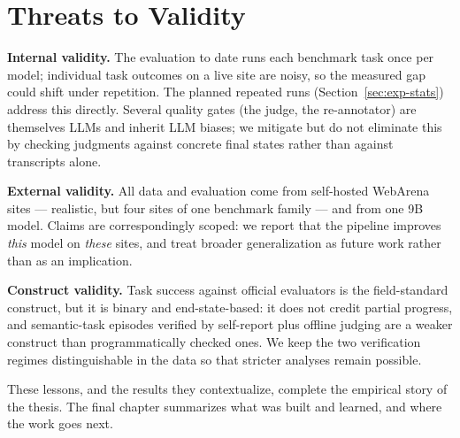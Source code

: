 \section{Threats to Validity}
\label{sec:disc-validity}

\textbf{Internal validity.} The evaluation to date runs each benchmark task
once per model; individual task outcomes on a live site are noisy, so the
measured gap could shift under repetition. The planned repeated runs
(Section~\ref{sec:exp-stats}) address this directly. Several quality gates
(the judge, the re-annotator) are themselves LLMs and inherit LLM biases;
we mitigate but do not eliminate this by checking judgments against concrete
final states rather than against transcripts alone.

\textbf{External validity.} All data and evaluation come from self-hosted
WebArena sites --- realistic, but four sites of one benchmark family ---
and from one 9B model. Claims are correspondingly scoped: we report that the
pipeline improves \emph{this} model on \emph{these} sites, and treat broader
generalization as future work rather than as an implication.

\textbf{Construct validity.} Task success against official evaluators is the
field-standard construct, but it is binary and end-state-based: it does not
credit partial progress, and semantic-task episodes verified by self-report
plus offline judging are a weaker construct than programmatically checked
ones. We keep the two verification regimes distinguishable in the data so
that stricter analyses remain possible.

\vspace{1em}
\noindent
These lessons, and the results they contextualize, complete the empirical
story of the thesis. The final chapter summarizes what was built and learned,
and where the work goes next.

